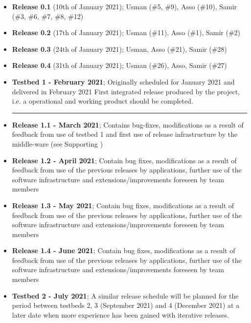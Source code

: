 \begin{itemize}
\item \textbf{Release 0.1} (10th of January 2021);\newline
Usman (\#5, \#9), Asso (\#10), Samir (\#3, \#6, \#7, \#8, \#12)
\item \textbf{Release 0.2} (17th of January 2021);\newline
Usman (\#11), Asso (\#1), Samir (\#2)
\item \textbf{Release 0.3} (24th of January 2021);\newline
Usman, Asso (\#21), Samir (\#28)
\item \textbf{Release 0.4} (31th of January 2021);\newline
Usman (\#26), Asso, Samir (\#27)
\item \textbf{Testbed 1 - February 2021};\newline
Originally scheduled for January 2021 and delivered in February 2021\newline
First integrated release produced by the project, i.e. a operational and working product should be completed.\\ 
\hspace*{-1cm}\rule{\textwidth}{0.4pt}
\item \textbf{Release 1.1 - March 2021};\newline
Contains bug-fixes, modifications as a result of feedback from use of testbed 1 and first use of release infrastructure by the middle-ware (see Supporting )
\item \textbf{Release 1.2 - April 2021};\newline
Contain bug fixes, modifications as a result of feedback from use of the previous releases by applications, further use of the software infrastructure and extensions/improvements foreseen by team members
\item \textbf{Release 1.3 - May 2021};\newline
Contain bug fixes, modifications as a result of feedback from use of the previous releases by applications, further use of the software infrastructure and extensions/improvements foreseen by team members
\item \textbf{Release 1.4 - June 2021};\newline
Contain bug fixes, modifications as a result of feedback from use of the previous releases by applications, further use of the software infrastructure and extensions/improvements foreseen by team members
\item \textbf{Testbed 2 - July 2021};\newline
A similar release schedule will be planned for the period between testbeds 2, 3 (September 2021) and 4 (December 2021) at a later date when more experience has been gained with iterative releases.
\end{itemize}


\newpage
